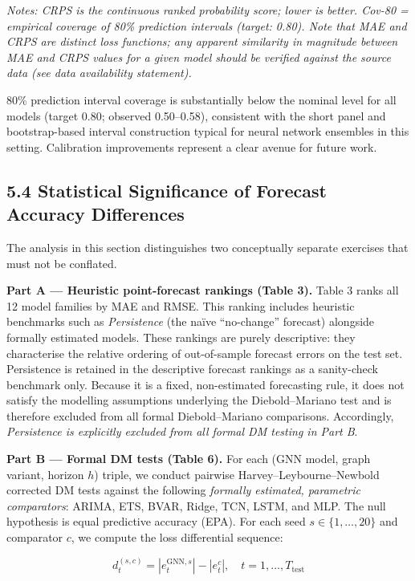 \documentclass[
]{article}
\begin{document}
\emph{Notes: CRPS is the continuous ranked probability score; lower is
better. Cov-80 = empirical coverage of 80\% prediction intervals
(target: 0.80). Note that MAE and CRPS are distinct loss functions; any
apparent similarity in magnitude between MAE and CRPS values for a given
model should be verified against the source data (see data availability
statement).}

80\% prediction interval coverage is substantially below the nominal
level for all models (target 0.80; observed 0.50--0.58), consistent with
the short panel and bootstrap-based interval construction typical for
neural network ensembles in this setting. Calibration improvements
represent a clear avenue for future work.

\subsection{5.4 Statistical Significance of Forecast Accuracy Differences}\label{statistical-significance-of-forecast-accuracy-differences}

The analysis in this section distinguishes two conceptually separate exercises that must not be conflated.

\textbf{Part A — Heuristic point-forecast rankings (Table 3).} Table 3 ranks all 12 model families by MAE and RMSE. This ranking includes heuristic benchmarks such as \emph{Persistence} (the na\"{i}ve ``no-change'' forecast) alongside formally estimated models. These rankings are purely descriptive: they characterise the relative ordering of out-of-sample forecast errors on the test set. Persistence is retained in the descriptive forecast rankings as a sanity-check benchmark only. Because it is a fixed, non-estimated forecasting rule, it does not satisfy the modelling assumptions underlying the Diebold--Mariano test and is therefore excluded from all formal Diebold--Mariano comparisons. Accordingly, \emph{Persistence is explicitly excluded from all formal DM testing in Part B}.

\textbf{Part B — Formal DM tests (Table 6).} For each (GNN model, graph variant, horizon $h$) triple, we conduct pairwise Harvey–Leybourne–Newbold corrected DM tests against the following \emph{formally estimated, parametric comparators}: ARIMA, ETS, BVAR, Ridge, TCN, LSTM, and MLP. The null hypothesis is equal predictive accuracy (EPA). For each seed $s \in \{1, \ldots, 20\}$ and comparator $c$, we compute the loss differential sequence:

\[d_t^{(s,c)} = |e_t^{\text{GNN},s}| - |e_t^{c}|, \quad t = 1, \ldots, T_{\text{test}}\]
\end{document}
